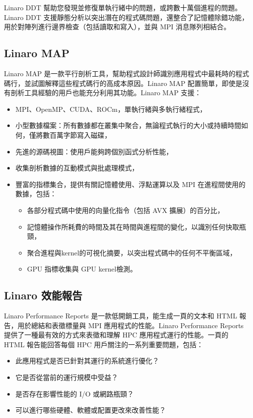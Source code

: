 Linaro DDT 幫助您發現並修復單執行緒中的問題，或跨數十萬個進程的問題。Linaro DDT 支援靜態分析以突出潛在的程式碼問題，還整合了記憶體除錯功能，用於對陣列進行邊界檢查（包括讀取和寫入），並與 MPI 消息隊列相結合。

\subsection{Linaro MAP}

Linaro MAP 是一款平行剖析工具，幫助程式設計師識別應用程式中最耗時的程式碼行，並試圖解釋這些程式碼行的高成本原因。Linaro MAP 配置簡單，即使是沒有剖析工具經驗的用戶也能充分利用其功能。Linaro MAP 支援：

\begin{itemize}
    \item MPI、OpenMP、CUDA、ROCm，單執行緒與多執行緒程式，
    \item 小型數據檔案：所有數據都在叢集中聚合，無論程式執行的大小或持續時間如何，僅將數百萬字節寫入磁碟，
    \item 先進的源碼視圖：使用戶能夠跨個別函式分析性能，
    \item 收集剖析數據的互動模式與批處理模式，
    \item 豐富的指標集合，提供有關記憶體使用、浮點運算以及 MPI 在進程間使用的數據，包括：
    \begin{itemize}
        \item 各部分程式碼中使用的向量化指令（包括 AVX 擴展）的百分比，
        \item 記憶體操作所耗費的時間及其在時間與進程間的變化，以識別任何快取瓶頸，
        \item 聚合進程與kernel的可視化摘要，以突出程式碼中的任何不平衡區域，
        \item GPU 指標收集與 GPU kernel檢測。
    \end{itemize}
\end{itemize}

\subsection{Linaro 效能報告}

Linaro Performance Reports 是一款低開銷工具，能生成一頁的文本和 HTML 報告，用於總結和表徵標量與 MPI 應用程式的性能。Linaro Performance Reports 提供了一種最有效的方式來表徵和理解 HPC 應用程式運行的性能。一頁的 HTML 報告能回答每個 HPC 用戶關注的一系列重要問題，包括：


\begin{itemize}
    \item 此應用程式是否已針對其運行的系統進行優化？
    \item 它是否從當前的運行規模中受益？
    \item 是否存在影響性能的 I/O 或網路瓶頸？
    \item 可以進行哪些硬體、軟體或配置更改來改善性能？
\end{itemize}

